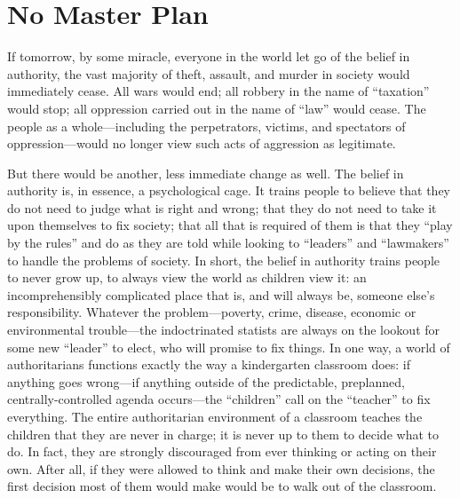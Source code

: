 \documentclass{book}
\begin{document}
\section{No Master Plan}

If tomorrow, by some miracle, everyone in the world let go of the belief in authority, the vast majority of theft, assault, and murder in society would immediately cease. All wars would end; all robbery in the name of \enquote{taxation} would stop; all oppression carried out in the name of \enquote{law} would cease. The people as a whole---including the perpetrators, victims, and spectators of oppression---would no longer view such acts of aggression as legitimate.

But there would be another, less immediate change as well. The belief in authority is, in essence, a psychological cage. It trains people to believe that they do not need to judge what is right and wrong; that they do not need to take it upon themselves to fix society; that all that is required of them is that they \enquote{play by the rules} and do as they are told while looking to \enquote{leaders} and \enquote{lawmakers} to handle the problems of society. In short, the belief in authority trains people to never grow up, to always view the world as children view it: an incomprehensibly complicated place that is, and will always be, someone else's responsibility. Whatever the problem---poverty, crime, disease, economic or environmental trouble---the indoctrinated statists are always on the lookout for some new \enquote{leader} to elect, who will promise to fix things. In one way, a world of authoritarians functions exactly the way a kindergarten classroom does: if anything goes wrong---if anything outside of the predictable, preplanned, centrally-controlled agenda occurs---the \enquote{children} call on the \enquote{teacher} to fix everything. The entire authoritarian environment of a classroom teaches the children that they are never in charge; it is never up to them to decide what to do. In fact, they are strongly discouraged from ever thinking or acting on their own. After all, if they were allowed to think and make their own decisions, the first decision most of them would make would be to walk out of the classroom.
\end{document}
